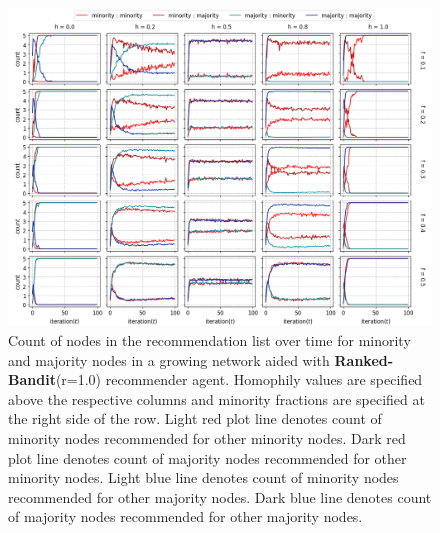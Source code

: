 \begin{appendices}

\begin{figure}[h!]
	\centering
	\includegraphics[width=1.0\textwidth]{images/count_rb10.png}
	\caption{Count of nodes in the recommendation list over time for minority and majority nodes in a growing network aided with \textbf{Ranked-Bandit}(r=1.0) recommender agent. Homophily values are specified above the respective columns and minority fractions are specified at the right side of the row. Light red plot line denotes count of minority nodes recommended for other minority nodes. Dark red plot line denotes count of majority nodes recommended for other minority nodes. Light blue line denotes count of minority nodes recommended for other majority nodes. Dark blue line denotes count of majority nodes recommended for other majority nodes.}
	\label{count_rb10}
\end{figure}



\end{appendices}
